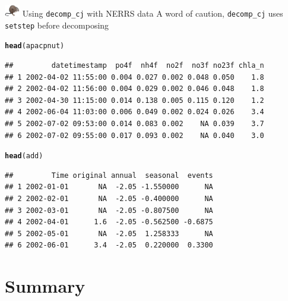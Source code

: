 \documentclass[xcolor=dvipsnames,serif]{beamer}\usepackage[]{graphicx}\usepackage[]{color}
\makeatletter
\newcommand{\hlstd}[1]{\textcolor[rgb]{0.345,0.345,0.345}{#1}}%
\newcommand{\hlkwd}[1]{\textcolor[rgb]{0.737,0.353,0.396}{\textbf{#1}}}%
\newenvironment{kframe}{%
 \def\at@end@of@kframe{}%
 \ifinner\ifhmode%
  \def\at@end@of@kframe{\end{minipage}}%
  \begin{minipage}{\columnwidth}%
 \fi\fi%
 \def\FrameCommand##1{\hskip\@totalleftmargin \hskip-\fboxsep
 \colorbox{shadecolor}{##1}\hskip-\fboxsep
     \hskip-\linewidth \hskip-\@totalleftmargin \hskip\columnwidth}%
 \MakeFramed {\advance\hsize-\width
   \@totalleftmargin\z@ \linewidth\hsize
   \@setminipage}}%
 {\par\unskip\endMakeFramed%
 \at@end@of@kframe}
\newenvironment{knitrout}{}{} %
\makeatother
\begin{document}
\begin{frame}[fragile]{\includegraphics[width = 0.05\textwidth]{imgs/swmprat.png} Using \texttt{decomp\_cj} with NERRS data}
A word of caution, \texttt{decomp\_cj} uses \texttt{setstep} before decomposing
\begin{knitrout}\scriptsize
{}\color{fgcolor}\begin{kframe}
\begin{alltt}
\hlkwd{head}\hlstd{(apacpnut)}
\end{alltt}
\begin{verbatim}
##         datetimestamp  po4f  nh4f  no2f  no3f no23f chla_n
## 1 2002-04-02 11:55:00 0.004 0.027 0.002 0.048 0.050    1.8
## 2 2002-04-02 11:56:00 0.004 0.029 0.002 0.046 0.048    1.8
## 3 2002-04-30 11:15:00 0.014 0.138 0.005 0.115 0.120    1.2
## 4 2002-06-04 11:03:00 0.006 0.049 0.002 0.024 0.026    3.4
## 5 2002-07-02 09:53:00 0.014 0.083 0.002    NA 0.039    3.7
## 6 2002-07-02 09:55:00 0.017 0.093 0.002    NA 0.040    3.0
\end{verbatim}
\begin{alltt}
\hlkwd{head}\hlstd{(add)}
\end{alltt}
\begin{verbatim}
##         Time original annual  seasonal  events
## 1 2002-01-01       NA  -2.05 -1.550000      NA
## 2 2002-02-01       NA  -2.05 -0.400000      NA
## 3 2002-03-01       NA  -2.05 -0.807500      NA
## 4 2002-04-01      1.6  -2.05 -0.562500 -0.6875
## 5 2002-05-01       NA  -2.05  1.258333      NA
## 6 2002-06-01      3.4  -2.05  0.220000  0.3300
\end{verbatim}
\end{kframe}
\end{knitrout}
\end{frame}

\section{Summary}
\end{document}
